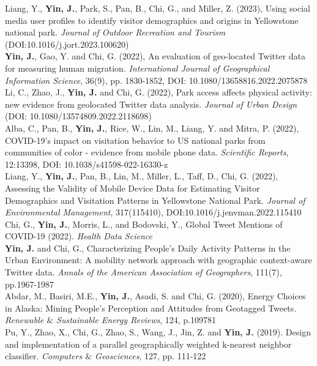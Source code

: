 \documentclass[11pt, a4paper]{article}
\newcommand{\years}[1]{\marginnote{\scriptsize #1}}
\begin{document}
\years{2023}Liang, Y., \textbf{Yin, J.}, Park, S., Pan, B., Chi, G., and Miller, Z. (2023), Using social media user profiles to identify visitor demographics and origins in Yellowstone national park. \textit{Journal of Outdoor Recreation and Tourism} (DOI:10.1016/j.jort.2023.100620)\\
\years{2022}\textbf{Yin, J.}, Gao, Y. and Chi, G. (2022), An evaluation of geo-located Twitter data for measuring human migration. \textit{International Journal of Geographical Information Science}, 36(9), pp. 1830-1852, DOI: 10.1080/13658816.2022.2075878\\
\years{2022}Li, C., Zhao, J., \textbf{Yin, J.}  and Chi, G. (2022), Park access affects physical activity: new evidence from geolocated Twitter data analysis. \textit{Journal of Urban Design}\\(DOI: 10.1080/13574809.2022.2118698)\\
\years{2022}Alba, C., Pan, B., \textbf{Yin, J.},  Rice, W., Lin, M.,  Liang, Y. and Mitra, P. (2022), COVID-19's impact on visitation behavior to US national parks from communities of color - evidence from mobile phone data. \textit{Scientific Reports}, 12:13398, DOI: 10.1038/s41598-022-16330-z\\
\years{2022}Liang, Y., \textbf{Yin, J.},  Pan, B.,  Lin, M., Miller, L., Taff, D., Chi, G. (2022), Assessing the Validity of Mobile Device Data for Estimating Visitor Demographics and Visitation Patterns in Yellowstone National Park. \textit{Journal of Environmental Management}, 317(115410), DOI:10.1016/j.jenvman.2022.115410\\
\years{2022}Chi, G., \textbf{Yin, J.}, Morris, L., and Bodovski, Y., Global Tweet Mentions of COVID-19 (2022). \textit{Health Data Science}\\
\years{2021}\textbf{Yin, J.} and  Chi, G., Characterizing People’s Daily Activity Patterns in the Urban Environment: A mobility network approach with geographic context-aware Twitter data. \textit{Annals of the American Association of Geographers}, 111(7), pp.1967-1987\\
\years{2020}Abdar, M., Basiri, M.E., \textbf{Yin, J.}, Asadi, S. and Chi, G. (2020), Energy Choices in Alaska: Mining People's Perception and Attitudes from Geotagged Tweets. \textit{Renewable $\&$ Sustainable Energy Reviews}, 124, p.109781\\
\years{2019}Pu, Y., Zhao, X., Chi, G., Zhao, S., Wang, J., Jin, Z. and \textbf{Yin, J.} (2019). Design and implementation of a parallel geographically weighted k-nearest neighbor classifier. \textit{Computers $\&$ Geosciences}, 127, pp. 111-122\\
\end{document}

